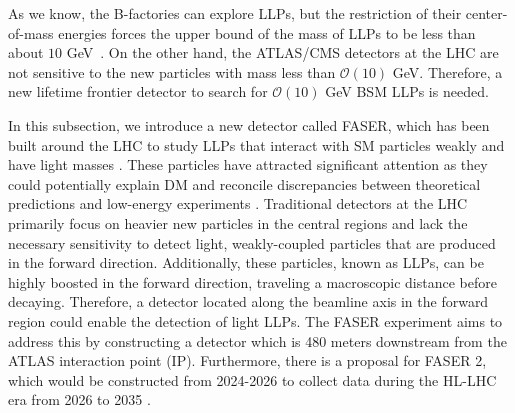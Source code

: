 \documentclass[preprint, superscriptaddress,amsmath, nofootinbib]{revtex4-1}
\begin{document}
As we know, the B-factories can explore LLPs, but the restriction of their center-of-mass energies forces the upper bound of the mass of LLPs to be less than about $10$ GeV~\cite{Acevedo:2021wiq}. On the other hand, the ATLAS/CMS detectors at the LHC are not sensitive to the new particles with mass less than $\mathcal{O}(10)$ GeV. Therefore, a new lifetime frontier detector to search for $\mathcal{O}(10)$ GeV BSM LLPs is needed. 

In this subsection, we introduce a new detector called FASER, which has been built around the LHC to study LLPs that interact with SM particles weakly and have light masses \cite{Battaglieri:2017aum}. These particles have attracted significant attention as they could potentially explain DM and reconcile discrepancies between theoretical predictions and low-energy experiments \cite{PhysRevLett.116.042501,Feng:2017uoz,PhysRevD.73.072003,BOEHM2004219}.
Traditional detectors at the LHC primarily focus on 
heavier new particles in the central regions 
and lack the necessary sensitivity to detect light, weakly-coupled particles that are produced in the forward direction. Additionally, these particles, known as LLPs, can be highly boosted in the forward direction, traveling a macroscopic distance before decaying. Therefore, a detector located along the beamline axis in the forward region could enable the detection of light LLPs. The FASER experiment aims to address this by constructing a detector  which is 480 meters downstream from the ATLAS interaction point (IP). 
Furthermore, there is a proposal for FASER 2, which would be constructed from 2024-2026 to collect data during the HL-LHC era from 2026 to 2035 \cite{FASER:2019aik}. 
\end{document}
